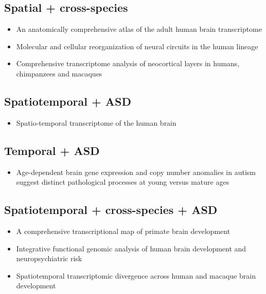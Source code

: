 \subsection{Spatial + cross-species}
\begin{itemize}
    \item An anatomically comprehensive atlas of the adult human brain transcriptome \cite{hawrylycz_anatomically_2012}
    \item Molecular and cellular reorganization of neural circuits in the human lineage \cite{sousa_molecular_2017}
    \item Comprehensive transcriptome analysis of neocortical layers in humans, chimpanzees and macaques \cite{he_comprehensive_2017}
\end{itemize}

\subsection{Spatiotemporal + ASD}
\begin{itemize}
    \item Spatio-temporal transcriptome of the human brain \cite{kang_spatio-temporal_2011}
\end{itemize}

\subsection{Temporal + ASD}
\begin{itemize}
    \item Age-dependent brain gene expression and copy number anomalies in autism suggest distinct pathological processes at young versus mature ages \cite{chow_age-dependent_2012}
\end{itemize}

\subsection{Spatiotemporal + cross-species + ASD}
\begin{itemize}
    \item A comprehensive transcriptional map of primate brain development \cite{bakken_comprehensive_2016}
    \item Integrative functional genomic analysis of human brain development and neuropsychiatric risk \cite{li_integrative_2018}
    \item Spatiotemporal transcriptomic divergence across human and macaque brain development \cite{zhu_spatiotemporal_2018}
\end{itemize}
